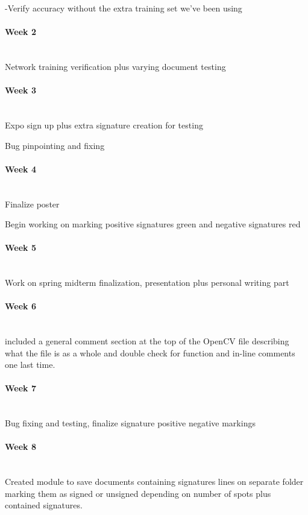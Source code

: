 \documentclass[article, onecolumn, draftclsnofoot,10pt, compsoc]{IEEEtran}
\begin{document}
-Verify accuracy without the extra training set we've been using

\paragraph{Week 2}
\mbox{}\\
Network training verification plus varying document testing

\paragraph{Week 3}
\mbox{}\\
Expo sign up plus extra signature creation for testing

Bug pinpointing and fixing

\paragraph{Week 4}
\mbox{}\\
Finalize poster 

Begin working on marking positive signatures green and negative signatures red

\paragraph{Week 5}
\mbox{}\\
Work on spring midterm finalization, presentation plus personal writing part

\paragraph{Week 6}
\mbox{}\\
included a general comment section at the top of the OpenCV file describing what the file is as a whole and double check for function and in-line comments one last time. 

\paragraph{Week 7}
\mbox{}\\
Bug fixing and testing, finalize signature positive negative markings

\paragraph{Week 8}
\mbox{}\\
Created module to save documents containing signatures lines on separate folder marking them as signed or unsigned depending on number of spots plus contained signatures. 
\end{document}
